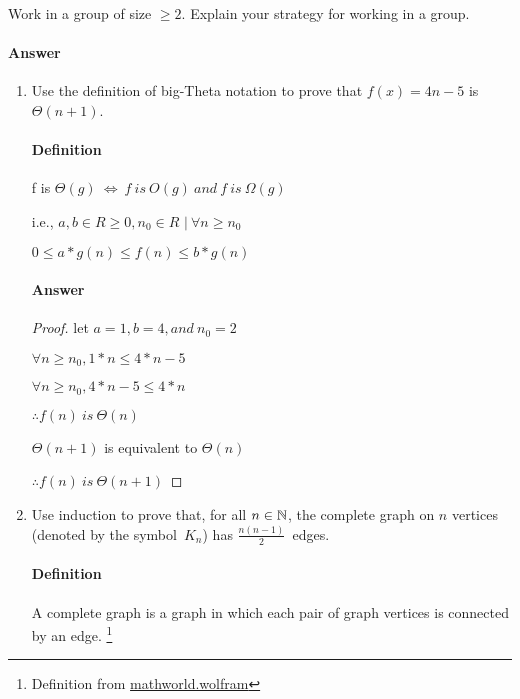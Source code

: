 \documentclass{article}
\begin{document}
Work in a group of size $\geq 2$.  Explain your strategy for working in a group.

\paragraph{Answer}
\todo{}

\collab{\todo{}}

\begin{enumerate}

      \item Use the definition of big-Theta notation to prove that $f(x)=4n-5$
            is $\Theta(n+1)$.

            \paragraph{Definition}
            f is $\Theta(g)\ \iff\ f\ is\ O(g)\ and\ f\ is\ \Omega(g)$

            i.e., $ a, b \in R \geq 0, n_{0} \in R$
            $|\ \forall n \geq n_0$

            $0 \leq a* g(n) \leq f(n) \leq b*g(n)$

            \paragraph{Answer}
            \begin{proof}
                  let $a = 1, b = 4, and\ n_0 = 2$

                  $\forall n \geq n_0, 1*n \leq 4*n - 5$

                  $\forall n \geq n_0, 4*n - 5 \leq 4*n$

                  $\therefore f(n)\ is\ \Theta(n)$

                  $\Theta(n+1)$ is equivalent to $\Theta(n)$

                  $\therefore f(n)\ is\ \Theta(n+1)$
            \end{proof}

      \item Use induction to prove that, for all $n \in {\mathbb N}$, the complete graph on
            $n$ vertices (denoted by the symbol~$K_n$) has $\frac{n(n-1)}{2}$~edges.

            \paragraph{Definition}
            A complete graph is a graph in which each pair of graph vertices is connected by an edge.
            \footnote{Definition from \href{https://mathworld.wolfram.com/CompleteGraph.html}{mathworld.wolfram}}


\end{enumerate}
\end{document}
